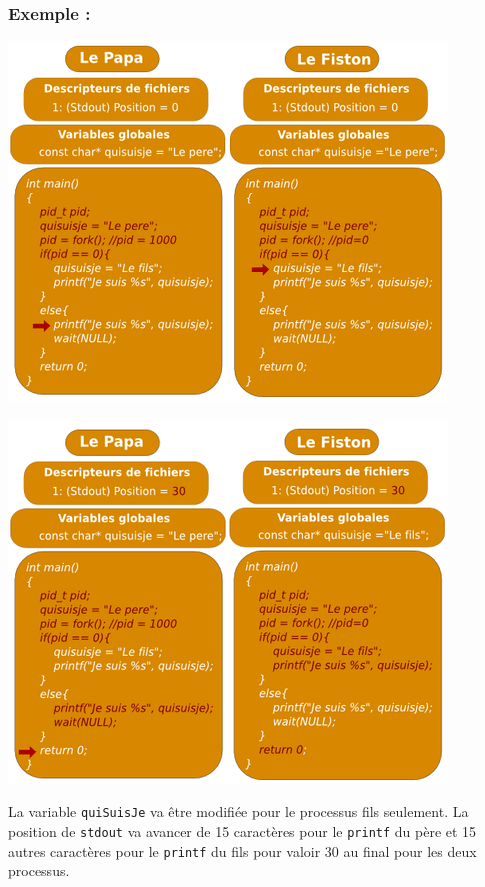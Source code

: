 			
		\subsubsection*{Exemple :}
			\begin{center}\includegraphics[scale=0.8]{../img/fork1.png}\end{center}
			\begin{center}\includegraphics[scale=0.8]{../img/fork2.png}\end{center}
			La variable \lstinline!quiSuisJe! va être modifiée pour le processus fils seulement. La position de \lstinline!stdout! va avancer de 15 caractères pour le \lstinline!printf! du père et 15 autres caractères pour le \lstinline!printf! du fils pour valoir 30 au final pour les deux processus.\\
